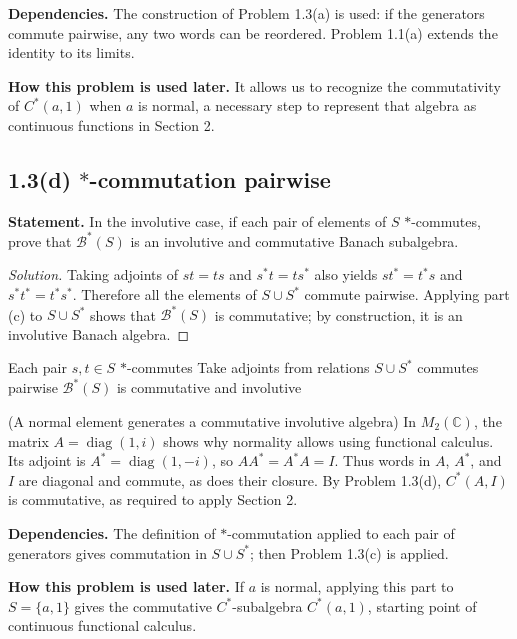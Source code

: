 \noindent\textbf{Dependencies.} The construction of Problem 1.3(a) is used: if the generators commute pairwise, any two words can be reordered. Problem 1.1(a) extends the identity to its limits.

\noindent\textbf{How this problem is used later.} It allows us to recognize the commutativity of $C^*(a,1)$ when $a$ is normal, a necessary step to represent that algebra as continuous functions in Section 2.

\subsection*{1.3(d) $*$-commutation pairwise}

\noindent\textbf{Statement.} In the involutive case, if each pair of elements of $S$ $*$-commutes, prove that $\mathcal B^*(S)$ is an involutive and commutative Banach subalgebra.

\begin{proof}[Solution]
Taking adjoints of $st=ts$ and $s^*t=ts^*$ also yields
$st^*=t^*s$ and $s^*t^*=t^*s^*$. Therefore all the elements of $S\cup S^*$ commute pairwise.
Applying part (c) to $S\cup S^*$ shows that $\mathcal B^*(S)$ is commutative; by construction,
it is an involutive Banach algebra.
\end{proof}

\proofdiagram
{Each pair $s,t\in S$ $*$-commutes}
{Take adjoints from relations}
{$S\cup S^*$ commutes pairwise}
{$\mathcal B^*(S)$ is commutative and involutive}

\begin{cthejemplo}{(A normal element generates a commutative involutive algebra)}
In $M_2(\mathbb C)$, the matrix $A=\operatorname{diag}(1,i)$ shows why
normality allows using functional calculus.
Its adjoint is $A^*=\operatorname{diag}(1,-i)$, so $AA^*=A^*A=I$.
Thus words in $A$, $A^*$, and $I$ are diagonal and commute, as does their closure.
By Problem 1.3(d), $C^*(A,I)$ is commutative, as required to apply Section 2.
\end{cthejemplo}

\noindent\textbf{Dependencies.} The definition of $*$-commutation applied to each pair of generators gives commutation in $S\cup S^*$; then Problem 1.3(c) is applied.

\noindent\textbf{How this problem is used later.} If $a$ is normal, applying this part to $S=\{a,1\}$ gives the commutative $C^*$-subalgebra $C^*(a,1)$, starting point of continuous functional calculus.


